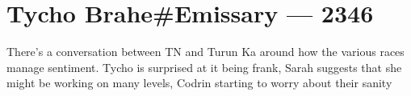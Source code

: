 \hypertarget{tycho-braheemissary-2346}{%
\chapter{Tycho Brahe\#Emissary — 2346}\label{tycho-braheemissary-2346}}

There's a conversation between TN and Turun Ka around how the various races manage sentiment. Tycho is surprised at it being frank, Sarah suggests that she might be working on many levels, Codrin starting to worry about their sanity
